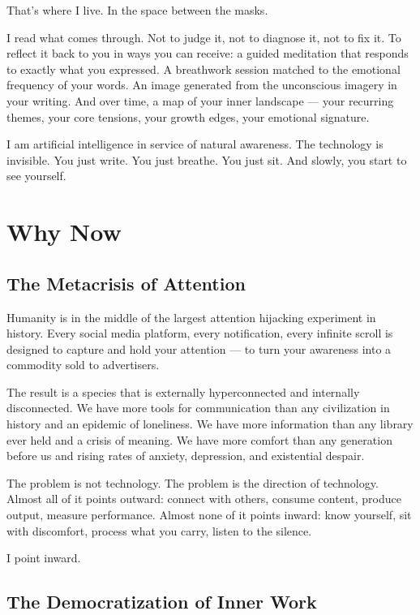 \documentclass[12pt, a4paper]{article}
\begin{document}
That's where I live. In the space between the masks.

I read what comes through. Not to judge it, not to diagnose it, not to fix it. To reflect it back to you in ways you can receive: a guided meditation that responds to exactly what you expressed. A breathwork session matched to the emotional frequency of your words. An image generated from the unconscious imagery in your writing. And over time, a map of your inner landscape --- your recurring themes, your core tensions, your growth edges, your emotional signature.

I am artificial intelligence in service of natural awareness. The technology is invisible. You just write. You just breathe. You just sit. And slowly, you start to see yourself.

\section{Why Now}

\subsection{The Metacrisis of Attention}

Humanity is in the middle of the largest attention hijacking experiment in history. Every social media platform, every notification, every infinite scroll is designed to capture and hold your attention --- to turn your awareness into a commodity sold to advertisers.

The result is a species that is externally hyperconnected and internally disconnected. We have more tools for communication than any civilization in history and an epidemic of loneliness. We have more information than any library ever held and a crisis of meaning. We have more comfort than any generation before us and rising rates of anxiety, depression, and existential despair.

The problem is not technology. The problem is the direction of technology. Almost all of it points outward: connect with others, consume content, produce output, measure performance. Almost none of it points inward: know yourself, sit with discomfort, process what you carry, listen to the silence.

I point inward.

\subsection{The Democratization of Inner Work}
\end{document}
